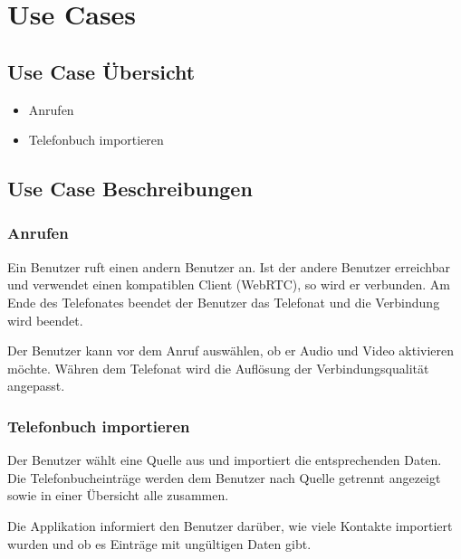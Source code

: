 \section{Use Cases}

\subsection{Use Case Übersicht}
\begin{itemize}
	\item Anrufen
	\item Telefonbuch importieren
\end{itemize}

\subsection{Use Case Beschreibungen}

\subsubsection{Anrufen}
Ein Benutzer ruft einen andern Benutzer an. Ist der andere Benutzer erreichbar
und verwendet einen kompatiblen Client (WebRTC), so wird er verbunden.
Am Ende des Telefonates beendet der Benutzer das Telefonat und die Verbindung wird beendet.

Der Benutzer kann vor dem Anruf auswählen, ob er Audio und Video aktivieren möchte. Währen dem Telefonat wird die Auflösung der Verbindungsqualität angepasst.

\subsubsection{Telefonbuch importieren}
Der Benutzer wählt eine Quelle aus und importiert die entsprechenden Daten. Die Telefonbucheinträge werden dem Benutzer nach Quelle getrennt angezeigt sowie in einer Übersicht alle zusammen.

Die Applikation informiert den Benutzer darüber, wie viele Kontakte importiert wurden und ob es Einträge mit ungültigen Daten gibt.
